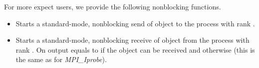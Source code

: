 For more expect users, we provide the following nonblocking functions.
\begin{itemize}
\item {}
  \sshortdescribe Starts a standard-mode, nonblocking send of object
   to the process with rank .
  
  
\item {}
  \sshortdescribe Starts a standard-mode, nonblocking receive of object
   from the process with rank . On output  equals
  to  if the object can be received and  otherwise (this
  is the same as for {\it MPI_Iprobe}).
\end{itemize}



